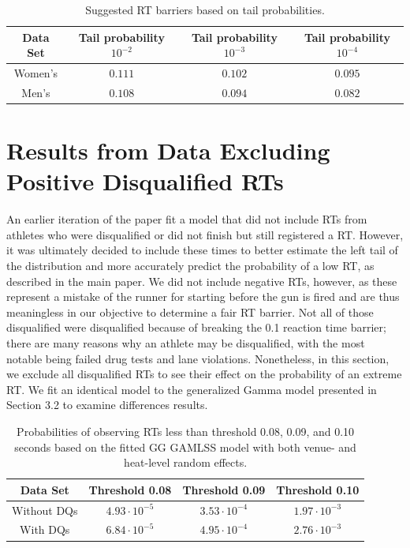 \documentclass[12pt, letterpaper]{article}
\begin{document}
\begin{table}
  \centering
  \caption{Suggested RT barriers based on tail probabilities.}
  \begin{tabular}{c c c c}
   \toprule
   Data Set & Tail probability  $10^{-2}$ & Tail probability  $10^{-3}$ & Tail probability $10^{-4}$ \\
   \midrule
   Women's & $0.111$ & $0.102$ & $0.095$ \\
   Men's   & $0.108$ & $0.094$ & $0.082$ \\
   \bottomrule
  \end{tabular}
  \label{tab:Sim_time_women}
\end{table}




\section{Results from Data Excluding Positive Disqualified RTs}

An earlier iteration of the paper fit a model that did not include RTs from
athletes who were disqualified or did not finish but still registered a RT.  
However, it was ultimately decided to include these times to better estimate the 
left tail of the distribution and more accurately predict the probability of a 
low RT, as described in the main paper.  
We did not include negative RTs, however, as these represent a mistake 
of the runner for starting before
the gun is fired and are thus meaningless in our objective to
determine a fair RT barrier.  Not all of those disqualified were
disqualified because of breaking the 0.1 reaction time barrier; there are many
reasons why an athlete may be disqualified, with the most notable being failed
drug tests and lane violations.  Nonetheless, in this section,
we exclude all disqualified RTs to see their effect on the probability of an
extreme RT.  We fit an identical model to the generalized Gamma model
presented in Section 3.2 to examine differences results.

\begin{table}
  \centering
  \caption{Probabilities of observing RTs less than threshold 0.08,
  0.09, and 0.10 seconds based on the
    fitted GG GAMLSS model with both venue- and heat-level
random effects.}
  \begin{tabular}{c c c c}
   \toprule
   Data Set & Threshold 0.08 & Threshold 0.09 & Threshold 0.10  \\
   \midrule
   Without DQs & $4.93\cdot10^{-5}$ & $3.53\cdot10^{-4}$ &  $1.97\cdot10^{-3}$  \\
   With DQs & $6.84\cdot10^{-5}$ & $4.95\cdot10^{-4}$ & $2.76\cdot10^{-3}$ \\
   \bottomrule
  \end{tabular}
  \label{tab:DQSim_probability}
\end{table}
\end{document}
